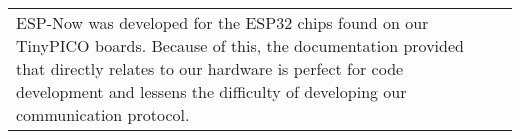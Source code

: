 \begin{xltabular}[H]{\textwidth}{p{0.47\textwidth} | p{0.47\textwidth}}
			&
			
			\\
			
			\midrule
			
			ESP-Now was developed for the ESP32 chips found on our TinyPICO boards. Because of this, the documentation provided that directly relates to our hardware is perfect for code development and lessens the difficulty of developing our communication protocol.
			
			&
			
			\\

		\end{xltabular} 
		\label{tbl:now}